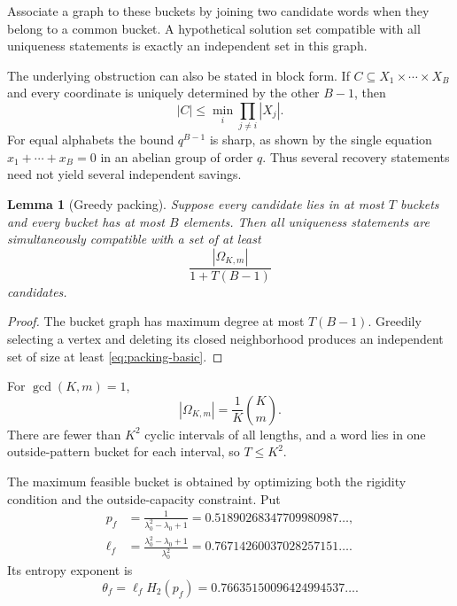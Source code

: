\documentclass[11pt]{amsart}
\numberwithin{equation}{section}
\newtheorem{lemma}[theorem]{Lemma}
\begin{document}
Associate a graph to these buckets by joining two candidate words when they belong to a common bucket.  A hypothetical solution set compatible with all uniqueness statements is exactly an independent set in this graph.

The underlying obstruction can also be stated in block form.  If
$C\subseteq X_1\times\cdots\times X_B$ and every coordinate is uniquely determined by the other $B-1$, then
\begin{equation}\label{eq:single-check}
|C|\le\min_i\prod_{j\ne i}|X_j|.
\end{equation}
For equal alphabets the bound $q^{B-1}$ is sharp, as shown by the single equation
$x_1+\cdots+x_B=0$ in an abelian group of order $q$.  Thus several recovery statements need not yield several independent savings.

\begin{lemma}[Greedy packing]\label{lem:greedy-packing}
Suppose every candidate lies in at most $T$ buckets and every bucket has at most $B$ elements.  Then all uniqueness statements are simultaneously compatible with a set of at least
\begin{equation}\label{eq:packing-basic}
\frac{|\Omega_{K,m}|}{1+T(B-1)}
\end{equation}
candidates.
\end{lemma}

\begin{proof}
The bucket graph has maximum degree at most $T(B-1)$.  Greedily selecting a vertex and deleting its closed neighborhood produces an independent set of size at least \eqref{eq:packing-basic}.
\end{proof}

For $\gcd(K,m)=1$,
\begin{equation}\label{eq:Omega-card}
|\Omega_{K,m}|=\frac1K\binom Km.
\end{equation}
There are fewer than $K^2$ cyclic intervals of all lengths, and a word lies in one outside-pattern bucket for each interval, so $T\le K^2$.

The maximum feasible bucket is obtained by optimizing both the rigidity condition and the outside-capacity constraint.  Put
\begin{align}
p_f&=\frac1{\lambda_0^2-\lambda_0+1}
=0.51890268347709980987\ldots,\label{eq:pf}\\
\ell_f&=\frac{\lambda_0^2-\lambda_0+1}{\lambda_0^2}
=0.76714260037028257151\ldots.\label{eq:ellf}
\end{align}
Its entropy exponent is
\begin{equation}\label{eq:theta-f}
\theta_f=\ell_f H_2(p_f)
=0.76635150096424994537\ldots.
\end{equation}
\end{document}

